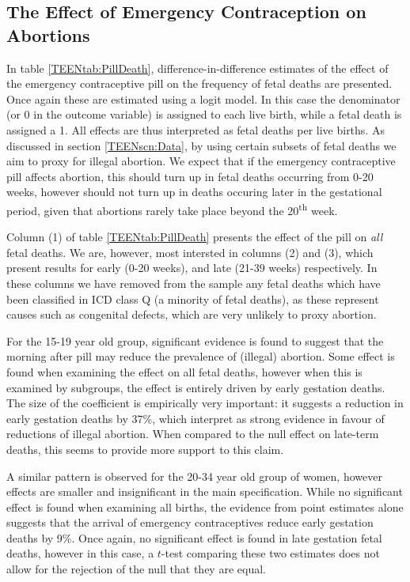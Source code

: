 \subsection{The Effect of Emergency Contraception on Abortions}
\label{TEENsscn:rabortion}
In table \ref{TEENtab:PillDeath}, difference-in-difference estimates of the 
effect of the emergency contraceptive pill on the frequency of fetal deaths are 
presented.  Once again these are estimated using a logit model. In this case the 
denominator (or 0 in the outcome variable) is assigned to each live birth, while 
a fetal death is assigned a 1.  All effects are thus interpreted as fetal deaths 
per live births.  As discussed in section \ref{TEENscn:Data}, by using certain 
subsets of fetal deaths we aim to proxy for illegal abortion.  We expect that if 
the emergency contraceptive pill affects abortion, this should turn up in fetal 
deaths occurring from 0-20 weeks, however should not turn up in deaths occuring
later in the gestational period, given that abortions rarely take place beyond 
the 20\textsuperscript{th} week.

Column (1) of table \ref{TEENtab:PillDeath} presents the effect of the pill on
\emph{all} fetal deaths.  We are, however, most intersted in columns (2) and (3),
which present results for early (0-20 weeks), and late (21-39 weeks) 
respectively.  In these columns we have removed from the sample any fetal deaths
which have been classified in ICD class Q (a minority of fetal deaths), as these 
represent causes such as congenital defects, which are very unlikely to proxy
abortion.

For the 15-19 year old group, significant evidence is found to suggest that 
the morning after pill may reduce the prevalence of (illegal) abortion.  Some
effect is found when examining the effect on all fetal deaths, however when 
this is examined by subgroups, the effect is entirely driven by early gestation
deaths.  The size of the coefficient is empirically very important: it 
suggests a reduction in early gestation deaths by 37\%, which \person interpret
as strong evidence in favour of reductions of illegal abortion.  When compared 
to the null effect on late-term deaths, this seems to provide more support to
this claim.

A similar pattern is observed for the 20-34 year old group of women, however
effects are smaller and insignificant in the main specification.  While no 
significant effect is found when examining all births, the evidence from point
estimates alone suggests that the arrival of emergency contraceptives reduce 
early gestation deaths by 9\%.  Once again, no significant effect is found in 
late gestation fetal deaths, however in this case, a $t$-test comparing these
two estimates does not allow for the rejection of the null that they are
equal.


